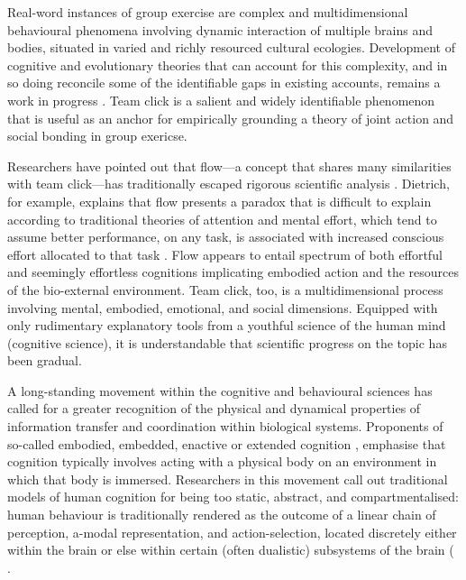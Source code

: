 \begin{CJK}{UTF8}{gbsn}
Real-word instances of group exercise are complex and multidimensional behavioural phenomena involving dynamic interaction of multiple brains and bodies, situated in varied and richly resourced cultural ecologies.  Development of cognitive and evolutionary theories that can account for this complexity, and in so doing reconcile some of the identifiable gaps in existing accounts, remains a work in progress \citep{Fuentes2016}.  Team click is a salient and widely identifiable phenomenon that is useful as an anchor for empirically grounding a theory of joint action and social bonding in group exericse.

Researchers have pointed out that flow---a concept that shares many similarities with team click---has traditionally escaped rigorous scientific analysis \citep{Dietrich2010a,Slingerland2014}.  Dietrich, for example, explains that flow presents a paradox that is difficult to explain according to traditional theories of attention and mental effort, which tend to assume better performance, on any task, is associated with increased conscious effort allocated to that task \citep{Dietrich2004b}.  Flow appears to entail spectrum of both effortful and seemingly effortless cognitions implicating embodied action and the resources of the bio-external environment.  Team click, too, is a multidimensional process involving mental, embodied, emotional, and social dimensions.  Equipped with only rudimentary explanatory tools from a youthful science of the human mind (cognitive science), it is understandable that scientific progress on the topic has been gradual.

A long-standing movement within the cognitive and behavioural sciences has called for a greater recognition of the physical and dynamical properties of information transfer and coordination within biological systems.  Proponents of so-called embodied, embedded, enactive or extended cognition \citep[now collectively referred to as ``4E cognition,'' see][]{Menary2010}, emphasise that cognition typically involves acting with a physical body on an environment in which that body is immersed. Researchers in this movement call out traditional models of human cognition for being too static, abstract, and compartmentalised: human behaviour is traditionally rendered as the outcome of a linear chain of perception, a-modal representation, and action-selection, located discretely either within the brain or else within certain (often dualistic) subsystems of the brain ( \citep[e.g., emotional and cognitive, System 1 (fast) and System 2 (slow), implicit and explicit, and so on; cf.][]{Diennes1999,Kahneman2011}.


\end{CJK}
